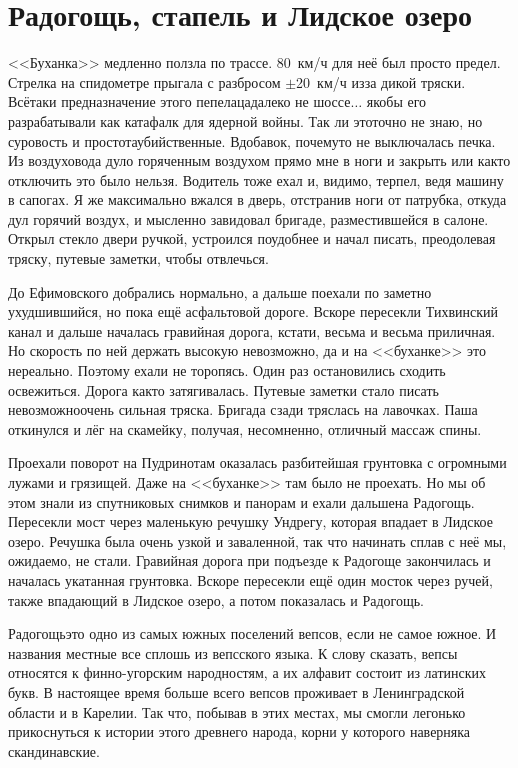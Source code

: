 \chapter{Радогощь, стапель и Лидское озеро} 
\vspace{-1.5cm}
\vepsianrose

<<Буханка>> медленно ползла по трассе. 80~км/ч для неё был просто предел. Стрелка на спидометре прыгала с разбросом $\pm$20~км/ч из\sdash за дикой тряски. Всё\sdash таки предназначение этого пепелаца\mdash далеко не шоссе$\ldots$ якобы его разрабатывали как катафалк для ядерной войны. Так ли это\mdash точно не знаю, но суровость и простота\mdash убийственные. Вдобавок, почему\sdash то не выключалась печка. Из воздуховода дуло горяченным воздухом прямо мне в ноги и закрыть или как\sdash то отключить это было нельзя. Водитель тоже ехал и, видимо, терпел, ведя машину в сапогах. Я же максимально вжался в дверь, отстранив ноги от патрубка, откуда дул горячий воздух, и мысленно завидовал бригаде, разместившейся в салоне. Открыл стекло двери ручкой, устроился поудобнее и начал писать, преодолевая тряску, путевые заметки, чтобы отвлечься. 

До Ефимовского добрались нормально, а дальше поехали по заметно ухудшившийся, но пока ещё асфальтовой дороге. Вскоре пересекли Тихвинский канал и дальше началась гравийная дорога, кстати, весьма и весьма приличная. Но скорость по ней держать высокую невозможно, да и на <<буханке>> это нереально. Поэтому ехали не торопясь. Один раз остановились сходить освежиться. Дорога как\sdash то затягивалась. Путевые заметки стало писать невозможно\mdash очень сильная тряска. Бригада сзади тряслась на лавочках. Паша откинулся и лёг на скамейку, получая, несомненно, отличный массаж спины.

Проехали поворот на Пудрино\mdash там оказалась разбитейшая грунтовка с огромными лужами и грязищей. Даже на <<буханке>> там было не проехать. Но мы об этом знали из спутниковых снимков и панорам и ехали дальше\mdash на Радогощь. Пересекли мост через маленькую речушку Ундрегу, которая впадает в Лидское озеро. Речушка была очень узкой и заваленной, так что начинать сплав с неё мы, ожидаемо, не стали. Гравийная дорога при подъезде к Радогоще закончилась и началась укатанная грунтовка. Вскоре пересекли ещё один мосток через ручей, также впадающий в Лидское озеро, а потом показалась и Радогощь. 

Радогощь\mdash это одно из самых южных поселений вепсов, если не самое южное. И названия местные все сплошь из вепсского языка. К слову сказать, вепсы относятся к финно-угорским народностям, а их алфавит состоит из латинских букв. В настоящее время больше всего вепсов проживает в Ленинградской области и в Карелии. Так что, побывав в этих местах, мы смогли легонько прикоснуться к истории этого древнего народа, корни у которого наверняка скандинавские. 

